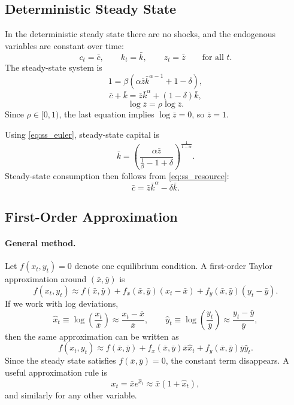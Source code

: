 \documentclass[12pt]{article}
\begin{document}
\subsection{Deterministic Steady State}

In the deterministic steady state there are no shocks, and the endogenous variables are constant over time:
\[
c_t=\bar c,\qquad k_t=\bar k,\qquad z_t=\bar z \qquad \text{for all } t.
\]
The steady-state system is
\begin{equation}
1 = \beta\left(\alpha \bar z \bar k^{\alpha-1} + 1-\delta\right),
\label{eq:ss_euler}
\end{equation}
\begin{equation}
\bar c + \bar k = \bar z \bar k^\alpha + (1-\delta)\bar k,
\label{eq:ss_resource}
\end{equation}
\begin{equation}
\log \bar z = \rho \log \bar z.
\label{eq:ss_ar1}
\end{equation}
Since $\rho \in [0,1)$, the last equation implies $\log \bar z = 0$, so $\bar z = 1$.

Using \eqref{eq:ss_euler}, steady-state capital is
\begin{equation*}
\bar k =
\left(
\frac{\alpha \bar z}{\frac{1}{\beta}-1+\delta}
\right)^{\frac{1}{1-\alpha}}.
\end{equation*}
Steady-state consumption then follows from \eqref{eq:ss_resource}:
\begin{equation*}
\bar c = \bar z \bar k^\alpha - \delta \bar k.
\end{equation*}

\subsection{First-Order Approximation}

\paragraph{General method.}
Let $f(x_t,y_t)=0$ denote one equilibrium condition. A first-order Taylor approximation around $(\bar x,\bar y)$ is
\begin{equation*}
f(x_t,y_t)
\approx
f(\bar x,\bar y)
+ f_x(\bar x,\bar y)(x_t-\bar x)
+ f_y(\bar x,\bar y)(y_t-\bar y).
\end{equation*}
If we work with log deviations,
\begin{equation*}
\hat x_t \equiv \log\left(\frac{x_t}{\bar x}\right)
\approx \frac{x_t-\bar x}{\bar x},
\qquad
\hat y_t \equiv \log\left(\frac{y_t}{\bar y}\right)
\approx \frac{y_t-\bar y}{\bar y},
\end{equation*}
then the same approximation can be written as
\begin{equation*}
f(x_t,y_t)
\approx
f(\bar x,\bar y)
+ f_x(\bar x,\bar y)\bar x \hat x_t
+ f_y(\bar x,\bar y)\bar y \hat y_t.
\end{equation*}
Since the steady state satisfies $f(\bar x,\bar y)=0$, the constant term disappears. A useful approximation rule is
\begin{equation*}
x_t = \bar x e^{\hat x_t} \approx \bar x(1+\hat x_t),
\end{equation*}
and similarly for any other variable.
\end{document}
